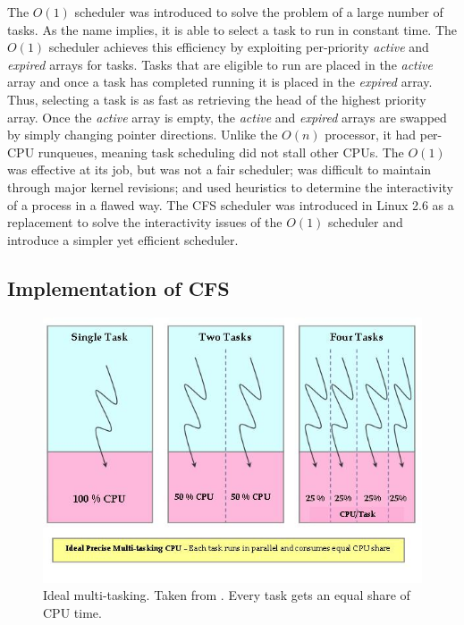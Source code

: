 \documentclass{sig-alternate-10pt}
\begin{document}
The $ O(1) $ scheduler was introduced to solve the problem of a large number of tasks. As the name implies, it is able to select a task to run in constant time. The $ O(1) $ scheduler achieves this efficiency by exploiting per-priority \textit{active} and \textit{expired} arrays for tasks. Tasks that are eligible to run are placed in the \textit{active} array and once a task has completed running it is placed in the \textit{expired} array. Thus, selecting a task is as fast as retrieving the head of the highest priority array. Once the \textit{active} array is empty, the \textit{active} and \emph{expired} arrays are swapped by simply changing pointer directions. Unlike the $ O(n) $ processor, it had per-CPU runqueues, meaning task scheduling did not stall other CPUs.
The $ O(1) $ was effective at its job, but was not a fair scheduler; was difficult to maintain through major kernel revisions; and used heuristics to determine the interactivity of a process in a flawed way. The CFS scheduler was introduced in Linux 2.6 as a replacement to solve the interactivity issues of the $ O(1) $ scheduler and introduce a simpler yet efficient scheduler.

\subsection{Implementation of CFS}

\begin{figure}
	\begin{center}
		\includegraphics[width=0.9\linewidth]{fig/mutlitasking.jpg}
		\caption{
			Ideal multi-tasking. Taken from \protect\cite{fig:multitask}. Every task gets an equal share of CPU time.
		}
		\label{fig:cfs_multitask}
	\end{center}
\end{figure}
\end{document}

